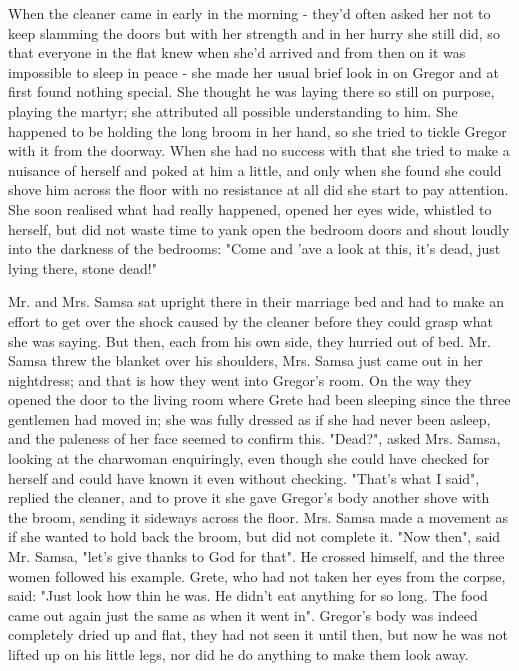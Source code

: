 When the cleaner came in early in the morning - they'd often asked her not to keep slamming the doors but with her strength and in her hurry she still did, so that everyone in the flat knew when she'd arrived and from then on it was impossible to sleep in peace - she made her usual brief look in on Gregor and at first found nothing special. She thought he was laying there so still on purpose, playing the martyr; she attributed all possible understanding to him. She happened to be holding the long broom in her hand, so she tried to tickle Gregor with it from the doorway. When she had no success with that she tried to make a nuisance of herself and poked at him a little, and only when she found she could shove him across the floor with no resistance at all did she start to pay attention. She soon realised what had really happened, opened her eyes wide, whistled to herself, but did not waste time to yank open the bedroom doors and shout loudly into the darkness of the bedrooms: "Come and 'ave a look at this, it's dead, just lying there, stone dead!"

Mr. and Mrs. Samsa sat upright there in their marriage bed and had to make an effort to get over the shock caused by the cleaner before they could grasp what she was saying. But then, each from his own side, they hurried out of bed. Mr. Samsa threw the blanket over his shoulders, Mrs. Samsa just came out in her nightdress; and that is how they went into Gregor's room. On the way they opened the door to the living room where Grete had been sleeping since the three gentlemen had moved in; she was fully dressed as if she had never been asleep, and the paleness of her face seemed to confirm this. "Dead?", asked Mrs. Samsa, looking at the charwoman enquiringly, even though she could have checked for herself and could have known it even without checking. "That's what I said", replied the cleaner, and to prove it she gave Gregor's body another shove with the broom, sending it sideways across the floor. Mrs. Samsa made a movement as if she wanted to hold back the broom, but did not complete it. "Now then", said Mr. Samsa, "let's give thanks to God for that". He crossed himself, and the three women followed his example. Grete, who had not taken her eyes from the corpse, said: "Just look how thin he was. He didn't eat anything for so long. The food came out again just the same as when it went in". Gregor's body was indeed completely dried up and flat, they had not seen it until then, but now he was not lifted up on his little legs, nor did he do anything to make them look away.

